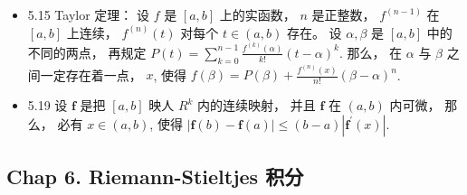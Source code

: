 \begin{itemize}
\item 5.15 Taylor 定理： 设 $f$ 是 $[a, b]$ 上的实函数， $n$ 是正整数， $f^{(n-1)}$ 在 $[a, b]$ 上连续， $f^{(n)}(t)$ 对每个 $t \in(a, b)$ 存在。 设 $\alpha, \beta$ 是 $[a, b]$ 中的不同的两点， 再规定 $P(t)=\sum_{k=0}^{n-1} \frac{f^{(k)}(\alpha)}{k !}(t-\alpha)^{k}$. 那么， 在 $\alpha$ 与 $\beta$ 之间一定存在着一点， $x$, 使得 $f(\beta)=P(\beta)+\frac{f^{(n)}(x)}{n !}(\beta-\alpha)^{n}$.

\item 5.19 设 $\mathbf{f}$ 是把 $[a, b]$ 映人 $R^{k}$ 内的连续映射， 并且 $\mathbf{f}$ 在 $(a, b)$ 内可微， 那么， 必有 $x \in(a, b)$, 使得 $|\mathbf{f}(b)-\mathbf{f}(a)| \leqslant(b-a)\left|\mathbf{f}^{\prime}(x)\right|$.
\end{itemize}


\subsection{Chap 6. Riemann-Stieltjes 积分}
